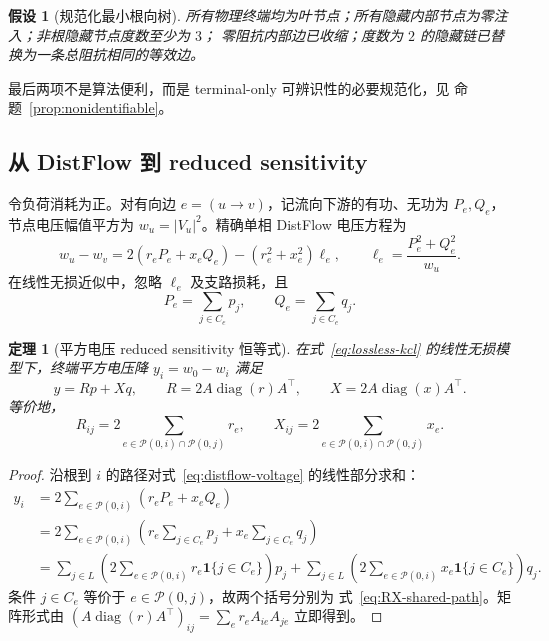 \documentclass[UTF8,11pt]{ctexart}
\newtheorem{assumption}[definition]{假设}
\newtheorem{theorem}[definition]{定理}
\newcommand{\pathset}{\mathcal P}
\newcommand{\diag}{\operatorname{diag}}
\begin{document}
\begin{assumption}[规范化最小根向树]
\label{ass:minimal-tree}
所有物理终端均为叶节点；所有隐藏内部节点为零注入；非根隐藏节点度数至少为 $3$；
零阻抗内部边已收缩；度数为 $2$ 的隐藏链已替换为一条总阻抗相同的等效边。
\end{assumption}

最后两项不是算法便利，而是 terminal-only 可辨识性的必要规范化，见
命题~\ref{prop:nonidentifiable}。

\subsection{从 DistFlow 到 reduced sensitivity}

令负荷消耗为正。对有向边 $e=(u\to v)$，记流向下游的有功、无功为 $P_e,Q_e$，
节点电压幅值平方为 $w_u=|V_u|^2$。精确单相 DistFlow 电压方程为
\begin{equation}
 w_u-w_v=2(r_eP_e+x_eQ_e)-(r_e^2+x_e^2)\ell_e,
 \qquad \ell_e=\frac{P_e^2+Q_e^2}{w_u}.
 \label{eq:distflow-voltage}
\end{equation}
在线性无损近似中，忽略 $\ell_e$ 及支路损耗，且
\begin{equation}
 P_e=\sum_{j\in C_e}p_j,\qquad Q_e=\sum_{j\in C_e}q_j.
 \label{eq:lossless-kcl}
\end{equation}

\begin{theorem}[平方电压 reduced sensitivity 恒等式]
\label{thm:reduced-sensitivity}
在式~\eqref{eq:lossless-kcl} 的线性无损模型下，终端平方电压降
$y_i=w_0-w_i$ 满足
\begin{equation}
 y=Rp+Xq,
 \qquad
 R=2A\diag(r)A^\top,
 \qquad
 X=2A\diag(x)A^\top.
 \label{eq:RX-path-form}
\end{equation}
等价地，
\begin{equation}
 R_{ij}=2\sum_{e\in\pathset(0,i)\cap\pathset(0,j)}r_e,
 \qquad
 X_{ij}=2\sum_{e\in\pathset(0,i)\cap\pathset(0,j)}x_e.
 \label{eq:RX-shared-path}
\end{equation}
\end{theorem}

\begin{proof}
沿根到 $i$ 的路径对式~\eqref{eq:distflow-voltage} 的线性部分求和：
\begin{align*}
 y_i
 &=2\sum_{e\in\pathset(0,i)}(r_eP_e+x_eQ_e)\\
 &=2\sum_{e\in\pathset(0,i)}
 \left(r_e\sum_{j\in C_e}p_j+x_e\sum_{j\in C_e}q_j\right)\\
 &=\sum_{j\in L}
 \left(2\sum_{e\in\pathset(0,i)}r_e\mathbf1\{j\in C_e\}\right)p_j
 +\sum_{j\in L}
 \left(2\sum_{e\in\pathset(0,i)}x_e\mathbf1\{j\in C_e\}\right)q_j.
\end{align*}
条件 $j\in C_e$ 等价于 $e\in\pathset(0,j)$，故两个括号分别为
式~\eqref{eq:RX-shared-path}。矩阵形式由
$(A\diag(r)A^\top)_{ij}=\sum_e r_eA_{ie}A_{je}$ 立即得到。
\end{proof}
\end{document}
